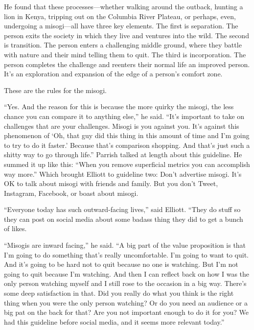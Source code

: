 			He found that these processes---whether walking around the outback, hunting a lion in Kenya, tripping out on the Columbia River Plateau, or perhaps, even, undergoing a misogi---all have three key elements. The first is separation. The person exits the society in which they live  and ventures into the wild. The second is transition. The person enters a challenging middle ground, where they battle with nature and their mind telling them to quit. The third is incorporation. The person completes the challenge and reenters their normal life an improved person. It's an exploration and expansion of the edge of a person's comfort zone.
				\begin{compactitem}
					\item These are the rules for the misogi.
				\end{compactitem}
			
			``Yes. And the reason for this is because the more quirky the misogi, the less chance you can compare it to anything else,'' he said. ``It's important to take on challenges that are your challenges. Misogi is you against you. It's against this phenomenon of `Oh, that guy did this thing in this amount of time and I'm going to try to do it faster.' Because that's comparison shopping. And that's just such a shitty way to go through life.'' Parrish talked at length about this guideline. He summed it up like this: ``When you remove superficial metrics you can accomplish way more.'' Which brought Elliott to guideline two: Don't advertise misogi. It's OK to talk about misogi with friends and family. But you don't Tweet, Instagram, Facebook, or boast about misogi. 

			``Everyone today has such outward-facing lives,'' said Elliott. ``They do stuff so they can post on social media about some badass thing they did to get a bunch of likes. 

			``Misogis are inward facing,'' he said. ``A big part of the value proposition is that I'm going to do something that's really uncomfortable. I'm going to want to quit. And it's going to be hard not to quit because no one is watching. But I'm not going to quit because I'm watching. And then I can reflect back on how I was the only person watching myself and I still rose to the occasion in a big way. There's some deep satisfaction in that. Did you really do what you think is the right thing when you were the only person watching? Or do you need an audience or a big pat on the back for that? Are you not important enough to do it for you? We had this guideline before social media, and it seems more relevant today.''
			
